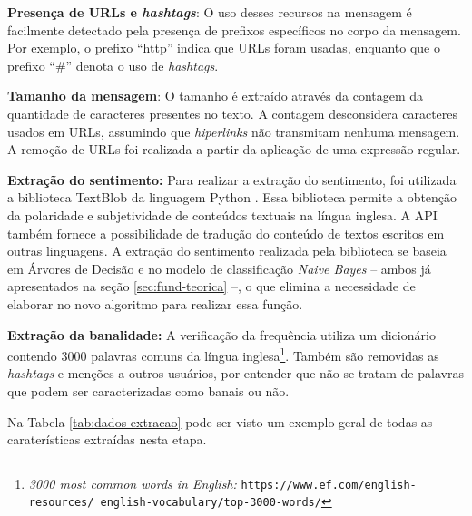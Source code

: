 \documentclass[oneside,openright,12pt]{ufsm_2015} %
\begin{document}
    \par \textbf{Presença de URLs e \textit{hashtags}}: O uso desses recursos na mensagem é facilmente detectado pela presença de prefixos específicos no corpo da mensagem. Por exemplo, o prefixo ``http'' indica que URLs foram usadas, enquanto que o prefixo ``\#'' denota o uso de \textit{hashtags}. 
    
    \par \textbf{Tamanho da mensagem}: O tamanho é extraído através da contagem da quantidade de caracteres presentes no texto. A contagem desconsidera caracteres usados em URLs, assumindo que \textit{hiperlinks} não transmitam nenhuma mensagem.  A remoção de URLs foi realizada a partir da aplicação de uma expressão regular.

    \par \textbf{Extração do sentimento:} Para realizar a extração do sentimento, foi utilizada a biblioteca TextBlob da linguagem Python \cite{loria:14}. Essa biblioteca  permite a obtenção da polaridade e subjetividade de conteúdos textuais na língua inglesa. A API também fornece a possibilidade de tradução do conteúdo de textos escritos em outras linguagens. A extração do sentimento realizada pela biblioteca se baseia em Árvores de Decisão e no modelo de classificação \textit{Naive Bayes} -- ambos já apresentados na seção \ref{sec:fund-teorica} --, o que elimina a necessidade de elaborar no novo algoritmo para realizar essa função. 

    \par \textbf{Extração da banalidade:} A verificação da frequência utiliza um dicionário contendo 3000 palavras comuns da língua inglesa\footnote{\textit{3000 most common words in English: }\texttt{https://www.ef.com/english-resources/ english-vocabulary/top-3000-words/}}. Também são removidas as \textit{hashtags} e menções a outros usuários, por entender que não se tratam de palavras que podem ser caracterizadas como banais ou não.
    
    \par Na Tabela \ref{tab:dados-extracao} pode ser visto um exemplo geral de todas as caraterísticas extraídas nesta etapa.
\end{document}
